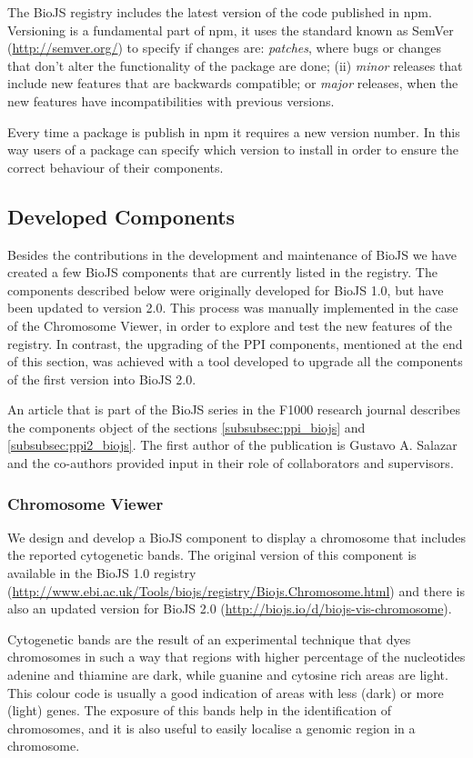The BioJS registry includes the latest version of the code published in npm. Versioning is a fundamental part of npm, it uses the standard known as SemVer (\url{http://semver.org/}) to specify if changes are: \emph{patches}, where bugs or changes that don't alter the functionality of the package are done; (ii) \emph{minor} releases that include new features that are backwards compatible; or  \emph{major} releases, when the new features have incompatibilities with previous versions.

Every time a package is publish in npm it requires a new version number. In this way users of a package can specify which version to install in order to ensure the correct behaviour of their components.

\subsection{Developed Components} \label{subsec:biojs_components}
Besides the contributions in the development and maintenance of BioJS we have created a few BioJS components that are currently listed in the registry. The components described below were originally developed for BioJS 1.0, but have been updated to version 2.0. This process was manually implemented in the case of the Chromosome Viewer, in order to explore and test the new features of the registry. In contrast, the upgrading of the PPI components, mentioned at the end of this section, was achieved with a tool developed to upgrade all the components of the first version into BioJS 2.0.

An article that is part of the BioJS series in the F1000 research journal describes the components object of the sections \ref{subsubsec:ppi_biojs} and \ref{subsubsec:ppi2_biojs}. The first author of the publication is Gustavo A. Salazar and the co-authors provided input in their role of collaborators and supervisors.

\subsubsection{Chromosome Viewer}
We design and develop a BioJS component to display a chromosome that includes the reported cytogenetic bands. The original version of this component is available in the BioJS 1.0 registry (\url{http://www.ebi.ac.uk/Tools/biojs/registry/Biojs.Chromosome.html}) and there is also an updated version for  BioJS 2.0 (\url{http://biojs.io/d/biojs-vis-chromosome}).

Cytogenetic bands are the result of an experimental technique that dyes chromosomes in such a way that regions with higher percentage of the nucleotides adenine and thiamine are dark, while guanine and cytosine rich areas are light. This colour code is usually a good indication of areas with less (dark) or more (light) genes. The exposure of this bands help in the identification of chromosomes, and it is also useful to easily localise a genomic region in a chromosome.

